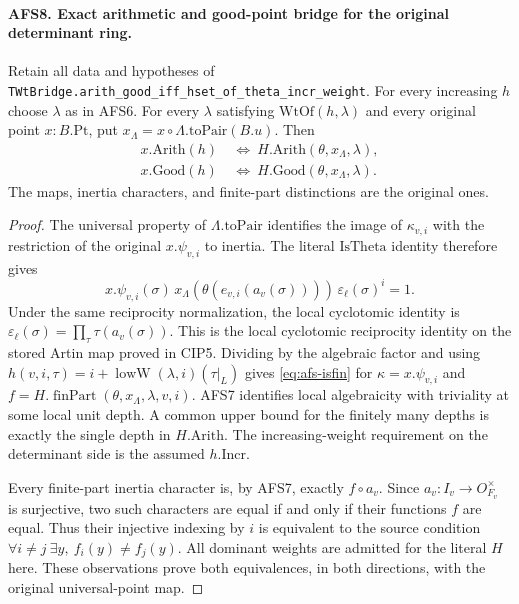 \paragraph{AFS8. Exact arithmetic and good-point bridge for the original determinant ring.}
\label{claim:AFS8}
Retain all data and hypotheses of
\texttt{TWtBridge.arith\_good\_iff\_hset\_of\_theta\_incr\_weight}.
For every increasing $h$ choose $\lambda$ as in AFS6.  For
every $\lambda$ satisfying $\mathrm{WtOf}(h,\lambda)$ and
every original point $x:B.\mathrm{Pt}$, put
$x_\Lambda=x\circ\Lambda.\mathrm{toPair}(B.u)$.  Then
\begin{align*}
 x.\mathrm{Arith}(h)&\ \Longleftrightarrow\
       H.\mathrm{Arith}(\theta,x_\Lambda,\lambda),\\
 x.\mathrm{Good}(h)&\ \Longleftrightarrow\
       H.\mathrm{Good}(\theta,x_\Lambda,\lambda).
\end{align*}
The maps, inertia characters, and finite-part distinctions are
the original ones.
\begin{proof}
The universal property of $\Lambda.\mathrm{toPair}$ identifies
the image of $\kappa_{v,i}$ with the restriction of the
original $x.\psi_{v,i}$ to inertia.  The literal
$\mathrm{IsTheta}$ identity therefore gives
\[
 x.\psi_{v,i}(\sigma)\,
 x_\Lambda(\theta(e_{v,i}(a_v(\sigma))))\,
                         \varepsilon_\ell(\sigma)^i=1.
\]
Under the same reciprocity normalization, the local cyclotomic
identity is
$\varepsilon_\ell(\sigma)=\prod_\tau\tau(a_v(\sigma))$.
This is the local cyclotomic reciprocity identity on the
stored Artin map proved in CIP5.  Dividing by the
algebraic factor and using
$h(v,i,\tau)=i+\operatorname{lowW}(\lambda,i)(\tau|_L)$
gives \eqref{eq:afs-isfin} for
$\kappa=x.\psi_{v,i}$ and
$f=H.\operatorname{finPart}(\theta,x_\Lambda,\lambda,v,i)$.
AFS7 identifies local algebraicity with triviality at some
local unit depth.  A common upper bound for the finitely
many depths is exactly the single depth in $H.\mathrm{Arith}$.
The increasing-weight requirement on the determinant side
is the assumed $h.\mathrm{Incr}$.

Every finite-part inertia character is, by AFS7, exactly
$f\circ a_v$.  Since $a_v:I_v\to O_{F_v}^{\times}$ is
surjective, two such characters are equal if and only if
their functions $f$ are equal.  Thus their injective indexing
by $i$ is equivalent to the source condition
$\forall i\ne j\ \exists y,\ f_i(y)\ne f_j(y)$.
All dominant weights are admitted for the literal $H$ here.
These observations prove both equivalences, in both
directions, with the original universal-point map.
\end{proof}

